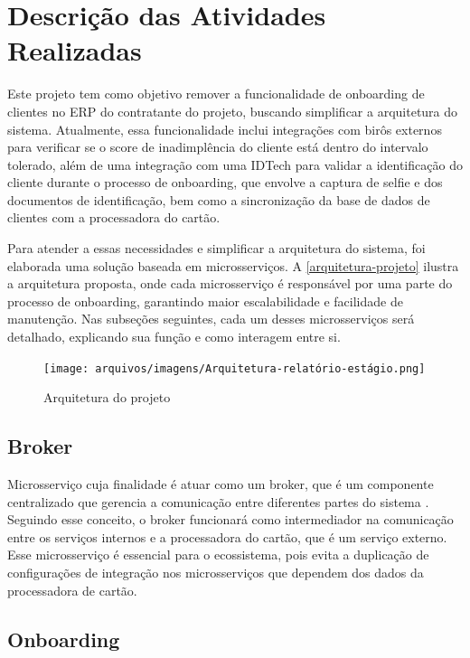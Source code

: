 \chapter{Descrição das Atividades Realizadas}
\label{cap:atividades}

Este projeto tem como objetivo remover a funcionalidade de onboarding de clientes no ERP
do contratante do projeto, buscando simplificar a arquitetura do sistema. 
Atualmente, essa funcionalidade inclui integrações com birôs externos para 
verificar se o score de inadimplência do cliente está dentro do intervalo tolerado, 
além de uma integração com uma IDTech para validar a identificação do cliente 
durante o processo de onboarding, que envolve a captura de selfie e dos documentos 
de identificação, bem como a sincronização da base de dados  de clientes com a 
processadora do cartão.

Para atender a essas necessidades e simplificar a arquitetura do sistema, 
foi elaborada uma solução baseada em microsserviços. 
A \autoref{arquitetura-projeto} ilustra a arquitetura proposta, 
onde cada microsserviço é responsável por uma parte do processo de onboarding, 
garantindo maior escalabilidade e facilidade de manutenção. Nas subseções seguintes, 
cada um desses microsserviços será detalhado, explicando sua 
função e como interagem entre si.


\begin{figure} [!h]
    \centering
    \caption{Arquitetura do projeto}
    \texttt{[image: arquivos/imagens/Arquitetura-relatório-estágio.png]}
    \label{arquitetura-projeto}
\end{figure}

\section{Broker}

Microsserviço cuja finalidade é atuar como um broker, que é um  
componente centralizado que gerencia a comunicação entre diferentes partes do sistema \cite{distributed:systems:book}. 
Seguindo esse conceito, o broker funcionará como intermediador na comunicação entre os 
serviços internos e a processadora do cartão, que é um serviço externo. 
Esse microsserviço é essencial para o ecossistema, pois evita a duplicação de 
configurações de integração nos microsserviços que dependem dos dados da processadora 
de cartão.

\section{Onboarding}

